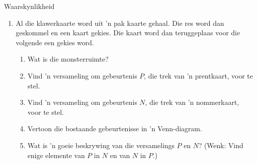 \begin{eocexercises}{Waarskynlikheid}
\begin{enumerate}[itemsep=5pt, label=\textbf{\arabic*}.]
  \item Al die klawerkaarte word uit 'n pak kaarte gehaal. Die res word dan geskommel en een kaart gekies. Die kaart word dan teruggeplaas voor die volgende een gekies word.
    \begin{enumerate}[noitemsep, label=\textbf{(\alph*)} ]
    \item Wat is die monsterruimte?
    \item Vind 'n versameling om gebeurtenis $P$, die trek van 'n prentkaart, voor te stel.
    \item Vind 'n versameling om gebeurtenis $N$, die trek van 'n nommerkaart, voor te stel.
    \item Vertoon die bostaande gebeurtenisse in 'n Venn-diagram.
    \item Wat is 'n goeie beskrywing van die versamelings $P$ en $N$?
      (Wenk: Vind enige elemente van $P$ in $N$ en van $N$ in $P$.)
    \end{enumerate}


\end{enumerate}
\end{eocexercises}
